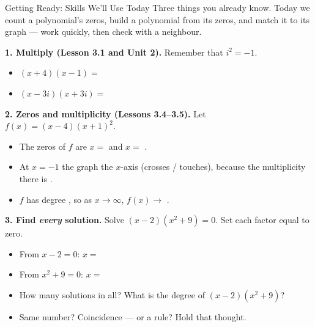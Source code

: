 \documentclass[12pt]{article}
\begin{document}

\vspace{0.10in}

\begin{notesbox}{Getting Ready: Skills We'll Use Today}
Three things you already know. Today we count a polynomial's zeros, build a polynomial from its
zeros, and match it to its graph --- work quickly, then check with a neighbour.

\vspace{8pt}
\textbf{1. Multiply (Lesson 3.1 and Unit 2).} Remember that $i^2=-1$.
\begin{itemize}[leftmargin=1.6em, itemsep=8pt]
  \item $(x+4)(x-1)=$ 
  \item $(x-3i)(x+3i)=$ 
\end{itemize}

\vspace{8pt}
\textbf{2. Zeros and multiplicity (Lessons 3.4--3.5).} Let $f(x)=(x-4)(x+1)^2$.
\begin{itemize}[leftmargin=1.6em, itemsep=8pt]
  \item The zeros of $f$ are $x=$  and $x=$ .
  \item At $x=-1$ the graph  the $x$-axis (crosses / touches), because the
        multiplicity there is .
  \item $f$ has degree , so as $x\to\infty$, $f(x)\to$ \ans{$\infty$}.
\end{itemize}

\vspace{8pt}
\textbf{3. Find \emph{every} solution.} Solve $(x-2)(x^2+9)=0$. Set each factor equal to zero.
\begin{itemize}[leftmargin=1.6em, itemsep=8pt]
  \item From $x-2=0$: \quad $x=$ 
  \item From $x^2+9=0$: \quad $x=$ 
  \item How many solutions in all?  \quad What is the degree of $(x-2)(x^2+9)$?
  \item Same number?  \; Coincidence --- or a rule? Hold that thought.
\end{itemize}
\end{notesbox}
\end{document}
